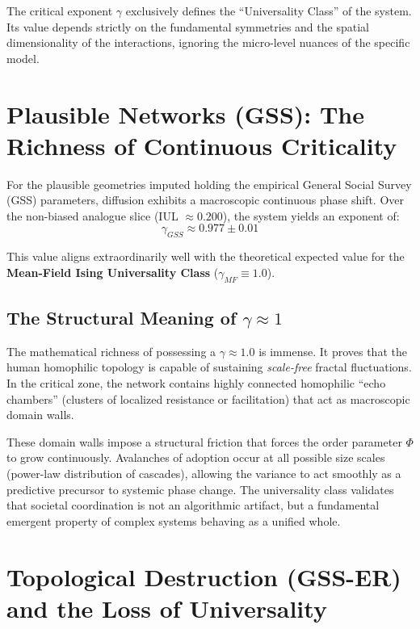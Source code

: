\documentclass[12pt, a4paper]{article}
\begin{document}
The critical exponent $\gamma$ exclusively defines the ``Universality Class'' of the system. Its value depends strictly on the fundamental symmetries and the spatial dimensionality of the interactions, ignoring the micro-level nuances of the specific model.

\section{Plausible Networks (GSS): The Richness of Continuous Criticality}

For the plausible geometries imputed holding the empirical General Social Survey (GSS) parameters, diffusion exhibits a macroscopic continuous phase shift. Over the non-biased analogue slice (IUL $\approx 0.200$), the system yields an exponent of:
\begin{equation}
    \gamma_{GSS} \approx 0.977 \pm 0.01
\end{equation}

This value aligns extraordinarily well with the theoretical expected value for the \textbf{Mean-Field Ising Universality Class} ($\gamma_{MF} \equiv 1.0$). 

\subsection{The Structural Meaning of $\gamma \approx 1$}
The mathematical richness of possessing a $\gamma \approx 1.0$ is immense. It proves that the human homophilic topology is capable of sustaining \textit{scale-free} fractal fluctuations. In the critical zone, the network contains highly connected homophilic ``echo chambers'' (clusters of localized resistance or facilitation) that act as macroscopic domain walls. 

These domain walls impose a structural friction that forces the order parameter $\Phi$ to grow continuously. Avalanches of adoption occur at all possible size scales (power-law distribution of cascades), allowing the variance to act smoothly as a predictive precursor to systemic phase change. The universality class validates that societal coordination is not an algorithmic artifact, but a fundamental emergent property of complex systems behaving as a unified whole.

\section{Topological Destruction (GSS-ER) and the Loss of Universality}
\end{document}
